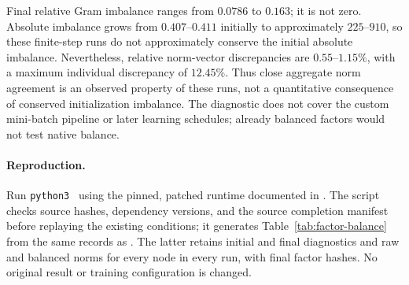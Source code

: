 

Final relative Gram imbalance ranges from \(0.0786\) to \(0.163\); it is not zero.
Absolute imbalance grows from \(0.407\)--\(0.411\) initially to approximately \(225\)--\(910\), so these finite-step runs do not approximately conserve the initial absolute imbalance.
Nevertheless, relative norm-vector discrepancies are \(0.55\)--\(1.15\%\), with a maximum individual discrepancy of \(12.45\%\).
Thus close aggregate norm agreement is an observed property of these runs, not a quantitative consequence of conserved initialization imbalance.
The diagnostic does not cover the custom mini-batch pipeline or later learning schedules; already balanced factors would not test native balance.

\paragraph{Reproduction.}
Run \texttt{python3}~ using the pinned, patched runtime documented in .
The script checks source hashes, dependency versions, and the source completion manifest before replaying the existing conditions; it generates Table~\ref{tab:factor-balance} from the same records as .
The latter retains initial and final diagnostics and raw and balanced norms for every node in every run, with final factor hashes.
No original result or training configuration is changed.
